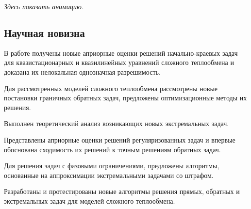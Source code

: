 \documentclass[8pt,a4paper]{article}
\begin{document}
    \textit{Здесь показать анимацию.}
    \subsection*{Научная новизна}
    В работе получены новые априорные оценки решений
    начально-краевых задач для квазистационарных и квазилинейных
    уравнений сложного теплообмена и доказана их нелокальная
    однозначная разрешимость.

    Для рассмотренных моделей сложного теплообмена
    рассмотрены новые постановки граничных обратных задач,
    предложены оптимизационные методы их решения.

    Выполнен теоретический анализ возникающих новых экстремальных задач.

    Представлены априорные оценки решений регуляризованных задач и впервые
    обоснована сходимость их решений к точным решениям обратных задач.

    Для решения задач с фазовыми ограничениями, предложены алгоритмы,
    основанные на аппроксимации экстремальными задачами со штрафом.

    Разработаны и протестированы новые алгоритмы решения прямых,
    обратных и экстремальных задач для моделей сложного теплообмена.
\end{document}
